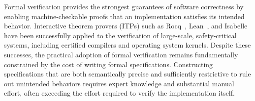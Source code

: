 


Formal verification provides the strongest guarantees of software correctness by enabling machine-checkable proofs that an implementation satisfies its intended behavior. Interactive theorem provers (ITPs) such as Rocq~\cite{huet1997coq}, Lean~\cite{de2015lean}, and Isabelle~\cite{paulson1994isabelle} have been successfully applied to the verification of large-scale, safety-critical systems, including certified compilers and operating system kernels. Despite these successes, the practical adoption of formal verification remains fundamentally constrained by the cost of writing formal specifications. Constructing specifications that are both semantically precise and sufficiently restrictive to rule out unintended behaviors requires expert knowledge and substantial manual effort, often exceeding the effort required to verify the implementation itself.


